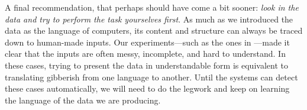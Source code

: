 A final recommendation, that perhaps should have come a bit sooner: \emph{look in the data and try to perform the task yourselves first}. As much as we introduced the data as the language of computers, its content and structure can always be traced down to human-made inputs. Our experiments---such as the ones in ---made it clear that the inputs are often messy, incomplete, and hard to understand. In these cases, trying to present the data in understandable form is equivalent to translating gibberish from one language to another. Until the systems can detect these cases automatically, we will need to do the legwork and keep on learning the language of the data we are producing.